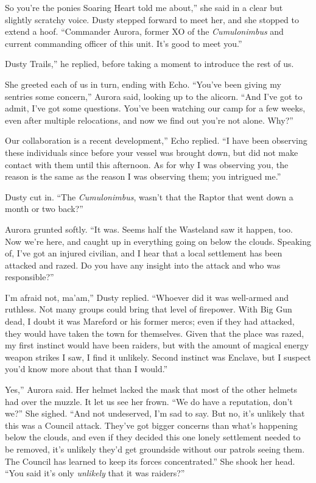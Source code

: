 \leavevmode{}So you’re the ponies Soaring Heart told me about,” she said in a clear but slightly scratchy voice. Dusty stepped forward to meet her, and she stopped to extend a hoof. “Commander Aurora, former XO of the \textit{Cumulonimbus} and current commanding officer of this unit. It’s good to meet you.”

\leavevmode{}Dusty Trails,” he replied, before taking a moment to introduce the rest of us.

She greeted each of us in turn, ending with Echo. “You’ve been giving my sentries some concern,” Aurora said, looking up to the alicorn. “And I’ve got to admit, I’ve got some questions. You’ve been watching our camp for a few weeks, even after multiple relocations, and now we find out you’re not alone. Why?”

\leavevmode{}Our collaboration is a recent development,” Echo replied. “I have been observing these individuals since before your vessel was brought down, but did not make contact with them until this afternoon. As for why I was observing you, the reason is the same as the reason I was observing them; you intrigued me.”

Dusty cut in. “The \textit{Cumulonimbus}, wasn’t that the Raptor that went down a month or two back?”

Aurora grunted softly. “It was. Seems half the Wasteland saw it happen, too. Now we’re here, and caught up in everything going on below the clouds. Speaking of, I’ve got an injured civilian, and I hear that a local settlement has been attacked and razed. Do you have any insight into the attack and who was responsible?”

\leavevmode{}I’m afraid not, ma’am,” Dusty replied. “Whoever did it was well-armed and ruthless. Not many groups could bring that level of firepower. With Big Gun dead, I doubt it was Mareford or his former mercs; even if they had attacked, they would have taken the town for themselves. Given that the place was razed, my first instinct would have been raiders, but with the amount of magical energy weapon strikes I saw, I find it unlikely. Second instinct was Enclave, but I suspect you’d know more about that than I would.”

\leavevmode{}Yes,” Aurora said. Her helmet lacked the mask that most of the other helmets had over the muzzle. It let us see her frown. “We do have a reputation, don’t we?” She sighed. “And not undeserved, I’m sad to say. But no, it’s unlikely that this was a Council attack. They’ve got bigger concerns than what’s happening below the clouds, and even if they decided this one lonely settlement needed to be removed, it’s unlikely they’d get groundside without our patrols seeing them. The Council has learned to keep its forces concentrated.” She shook her head. “You said it’s only \textit{unlikely} that it was raiders?”

